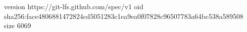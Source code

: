 version https://git-lfs.github.com/spec/v1
oid sha256:face4806881472824cd5051283c1ea9ea0f07828c96507783a64bc538a589508
size 6069
